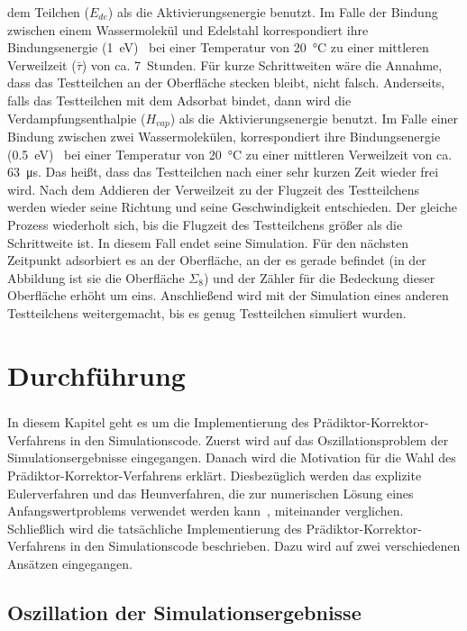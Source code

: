\documentclass{listhesis}
\begin{document}
dem Teilchen ($E_{de}$) als die Aktivierungsenergie benutzt. Im Falle der Bindung zwischen einem Wassermolekül und Edelstahl korrespondiert ihre Bindungsenergie (\SI{1}{\electronvolt})~\cite{grinham} bei einer Temperatur von \SI{20}{\celsius} zu einer mittleren Verweilzeit ($\bar{\tau}$) von ca. \SI{7}{Stunden}. Für kurze Schrittweiten wäre die Annahme, dass das Testteilchen an der Oberfläche stecken bleibt, nicht falsch. Anderseits, falls das Testteilchen mit dem Adsorbat bindet, dann wird die Verdampfungsenthalpie ($H_{vap}$) als die Aktivierungsenergie benutzt. Im Falle einer Bindung zwischen zwei Wassermolekülen, korrespondiert ihre Bindungsenergie (\SI{0.5}{\electronvolt})~\cite{grinham} bei einer Temperatur von \SI{20}{\celsius} zu einer mittleren Verweilzeit von ca. \SI{63}{\micro\s}. Das heißt, dass das Testteilchen nach einer sehr kurzen Zeit wieder frei wird. Nach dem Addieren der Verweilzeit zu der Flugzeit des Testteilchens werden wieder seine Richtung und seine Geschwindigkeit entschieden. Der gleiche Prozess wiederholt sich, bis die Flugzeit des Testteilchens größer als die Schrittweite ist. In diesem Fall endet seine Simulation. Für den nächsten Zeitpunkt adsorbiert es an der Oberfläche, an der es gerade befindet (in der Abbildung ist sie die Oberfläche $\Sigma_8$) und der Zähler für die Bedeckung dieser Oberfläche erhöht um eins. Anschließend wird mit der Simulation eines anderen Testteilchens weitergemacht, bis es genug Testteilchen simuliert wurden.

\chapter{Durchführung} \label{chap:durchfuehrung}
\paragraph{}
In diesem Kapitel geht es um die Implementierung des Prädiktor-Korrektor-Verfa\-hrens in den Simulationscode. Zuerst wird auf das Oszillationsproblem der Simulationsergebnisse eingegangen. Danach wird die Motivation für die Wahl des Prädiktor-Korrektor-Verfahrens erklärt. Diesbezüglich werden das explizite Eulerverfahren und das Heunverfahren, die zur numerischen Lösung eines Anfangswertproblems verwendet werden kann~\cite{ulbrich}, miteinander verglichen. Schließlich wird die tatsächliche Implementierung des Prädiktor-Korrektor-Verfahrens in den Simulationscode beschrieben. Dazu wird auf zwei verschiedenen Ansätzen eingegangen.

\section{Oszillation der Simulationsergebnisse} \label{section:oscillation}
\end{document}
